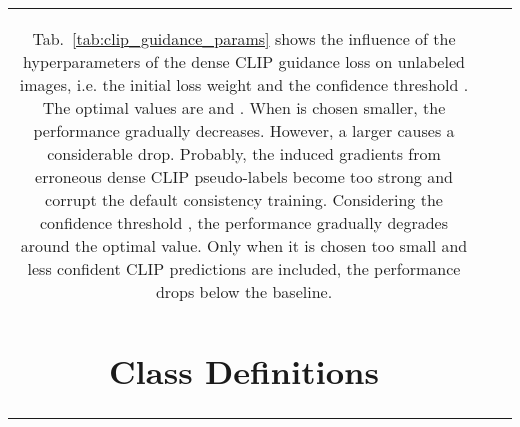 \documentclass[10pt,twocolumn,letterpaper]{article}
\begin{document}
\begin{figure*}
\begin{tabular}{ccc}
Tab.~\ref{tab:clip_guidance_params} shows the influence of the hyperparameters of the dense CLIP guidance loss on unlabeled images, i.e. the initial loss weight  and the confidence threshold . The optimal values are  and . When  is chosen smaller, the performance gradually decreases. However, a larger  causes a considerable drop. Probably, the induced gradients from erroneous dense CLIP pseudo-labels become too strong and corrupt the default consistency training. Considering the confidence threshold , the performance gradually degrades around the optimal value. Only when it is chosen too small and less confident CLIP predictions are included, the performance drops below the baseline.

\section{Class Definitions}
\label{sec:supp_class_definitions}


\end{tabular}
\end{figure*}
\end{document}

